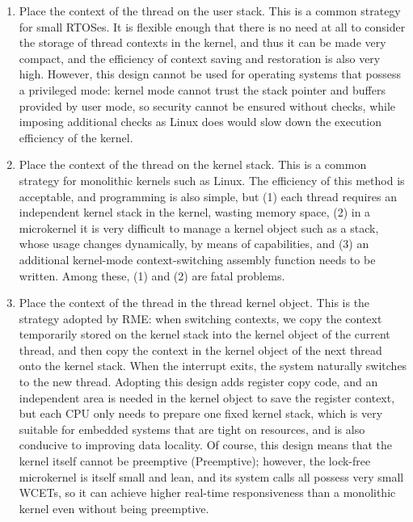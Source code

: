 \begin{enumerate}
\def\labelenumi{\arabic{enumi}.}
\item
  Place the context of the thread on the user stack. This is a common strategy for small RTOSes. It is flexible enough that there is no need at all to consider the storage of thread contexts in the kernel, and thus it can be made very compact, and the efficiency of context saving and restoration is also very high. However, this design cannot be used for operating systems that possess a privileged mode: kernel mode cannot trust the stack pointer and buffers provided by user mode, so security cannot be ensured without checks, while imposing additional checks as Linux does would slow down the execution efficiency of the kernel.
\item
  Place the context of the thread on the kernel stack. This is a common strategy for monolithic kernels such as Linux. The efficiency of this method is acceptable, and programming is also simple, but (1) each thread requires an independent kernel stack in the kernel, wasting memory space, (2) in a microkernel it is very difficult to manage a kernel object such as a stack, whose usage changes dynamically, by means of capabilities, and (3) an additional kernel-mode context-switching assembly function needs to be written. Among these, (1) and (2) are fatal problems.
\item
  Place the context of the thread in the thread kernel object. This is the strategy adopted by RME: when switching contexts, we copy the context temporarily stored on the kernel stack into the kernel object of the current thread, and then copy the context in the kernel object of the next thread onto the kernel stack. When the interrupt exits, the system naturally switches to the new thread. Adopting this design adds register copy code, and an independent area is needed in the kernel object to save the register context, but each CPU only needs to prepare one fixed kernel stack, which is very suitable for embedded systems that are tight on resources, and is also conducive to improving data locality. Of course, this design means that the kernel itself cannot be preemptive (Preemptive); however, the lock-free microkernel is itself small and lean, and its system calls all possess very small WCETs, so it can achieve higher real-time responsiveness than a monolithic kernel even without being preemptive.


\end{enumerate}
